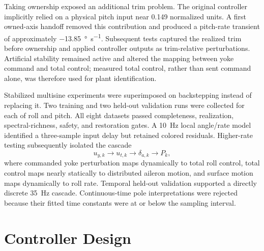 \documentclass[conference]{IEEEtran}
\begin{document}
Taking ownership exposed an additional trim problem. The original controller
implicitly relied on a physical pitch input near 0.149 normalized units. A
first owned-axis handoff removed this contribution and produced a pitch-rate
transient of approximately \SI{-13.85}{\degree\per\second}. Subsequent tests captured the
realized trim before ownership and applied controller outputs as trim-relative
perturbations. Artificial stability remained active and altered the mapping
between yoke command and total control; measured total control, rather than sent
command alone, was therefore used for plant identification.

Stabilized multisine experiments were superimposed on backstepping instead of
replacing it. Two training and two held-out validation runs were collected for
each of roll and pitch. All eight datasets passed completeness, realization,
spectral-richness, safety, and restoration gates. A \SI{10}{\hertz} local angle/rate
model identified a three-sample input delay but retained colored residuals.
Higher-rate testing subsequently isolated the cascade
\begin{equation}
u_{y,k}\longrightarrow u_{t,k}\longrightarrow \delta_{a,k}
\longrightarrow P_k,
\label{eq:cascade}
\end{equation}
where commanded yoke perturbation maps dynamically to total roll control,
total control maps nearly statically to distributed aileron motion, and surface
motion maps dynamically to roll rate. Temporal held-out validation supported a
directly discrete \SI{35}{\hertz} cascade. Continuous-time pole interpretations were
rejected because their fitted time constants were at or below the sampling
interval.

\section{Controller Design}
\end{document}
